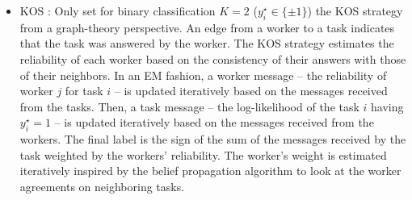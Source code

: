 \documentclass{cap2024}
\begin{document}
\begin{itemize}
  \item KOS \citep{karger2011iterative}: Only set for binary classification $K=2$ ($y_i^\star\in\{\pm 1\}$) the KOS strategy from a graph-theory perspective.
  An edge from a worker to a task indicates that the task was answered by the worker.
  The KOS strategy estimates the reliability of each worker based on the consistency of their answers with those of their neighbors.
  In an EM fashion, a worker message -- the reliability of worker $j$ for task $i$ -- is updated iteratively based on the messages received from the tasks.
  Then, a task message -- the log-likelihood of the task $i$ having $y_i^\star=1$ -- is updated iteratively based on the messages received from the workers.
  The final label is the sign of the sum of the messages received by the task weighted by the workers' reliability.
  The worker's weight is estimated iteratively inspired by the belief propagation algorithm \citep{pearlBelief} to look at the worker agreements on neighboring tasks.

\end{itemize}
\end{document}
